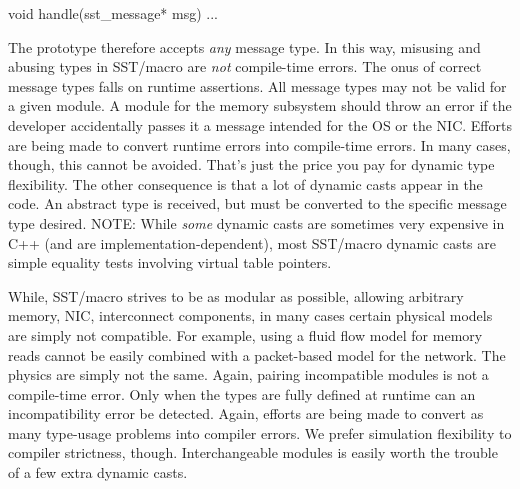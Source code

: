 \begin{CppCode}
void
handle(sst_message* msg){
...
}
\end{CppCode}
The prototype therefore accepts \emph{any} message type.
In this way, misusing and abusing types in SST/macro are \emph{not} compile-time errors.
The onus of correct message types falls on runtime assertions.
All message types may not be valid for a given module.
A module for the memory subsystem should throw an error if the developer accidentally passes it a message intended for the OS or the NIC.
Efforts are being made to convert runtime errors into compile-time errors.
In many cases, though, this cannot be avoided.
That's just the price you pay for dynamic type flexibility.
The other consequence is that a lot of dynamic casts appear in the code.
An abstract  type is received, but must be converted to the specific message type desired.
NOTE: While \emph{some} dynamic casts are sometimes very expensive in C++ (and are implementation-dependent),
most SST/macro dynamic casts are simple equality tests involving virtual table pointers.

While, SST/macro strives to be as modular as possible, allowing arbitrary memory, NIC, interconnect components,
in many cases certain physical models are simply not compatible.
For example, using a fluid flow model for memory reads cannot be easily combined with a packet-based model for the network.
The physics are simply not the same.
Again, pairing incompatible modules is not a compile-time error.
Only when the types are fully defined at runtime can an incompatibility error be detected.
Again, efforts are being made to convert as many type-usage problems into compiler errors.
We prefer simulation flexibility to compiler strictness, though. 
Interchangeable modules is easily worth the trouble of a few extra dynamic casts.

